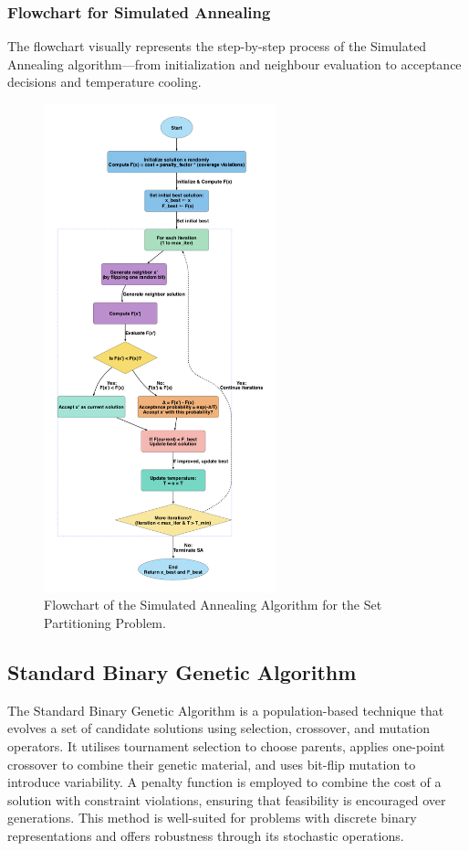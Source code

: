 \documentclass[12pt]{article}
\begin{document}
\subsubsection{Flowchart for Simulated Annealing}
The flowchart visually represents the step-by-step process of the Simulated Annealing algorithm—from initialization and neighbour evaluation to acceptance decisions and temperature cooling.

\begin{figure}[htbp]
  \centering
  \includegraphics[width=0.60\textwidth]{simulated_annealing_flowchart.png}
  \caption{Flowchart of the Simulated Annealing Algorithm for the Set Partitioning Problem.}
  \label{fig:flowchart1}
\end{figure}

\newpage

\subsection{Standard Binary Genetic Algorithm}
The Standard Binary Genetic Algorithm is a population-based technique that evolves a set of candidate solutions using selection, crossover, and mutation operators. 
It utilises tournament selection to choose parents, applies one-point crossover to combine their genetic material, and uses bit-flip mutation to introduce variability. 
A penalty function is employed to combine the cost of a solution with constraint violations, ensuring that feasibility is encouraged over generations. 
This method is well-suited for problems with discrete binary representations and offers robustness through its stochastic operations.
\end{document}
